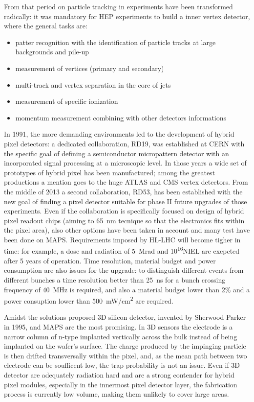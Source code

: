     From that period on particle tracking in experiments have been transformed radically: it was mandatory for HEP experiments to build a inner vertex detector, where the general tasks are:
    \begin{itemize}
        \item patter recognition with the identification of particle tracks at large backgrounds and pile-up
        \item measurement of vertices (primary and secondary)
        \item multi-track and vertex separation in the core of jets
        \item measurement of specific ionization
        \item momentum measurement combining with other detectors informations
    \end{itemize}

    In 1991, the more demanding environments led to the development of hybrid pixel detectors: a dedicated collaboration, RD19, was established at CERN with the specific goal of defining a semiconductor micropattern detector with an incorporated signal processing at a microscopic level. 
    In those years a wide set of prototypes of hybrid pixel has been manufactured; among the greatest productions a mention goes to the huge ATLAS and CMS vertex detectors. 
    From the middle of 2013 a second collaboration, RD53, has been established with the new goal of finding a pixel detector suitable for phase II future upgrades of those experiments. Even if the collaboration is specifically focused on design of hybrid pixel readout chips (aiming to \SI{65}{nm} tecnique so that the electronics fits within the pixel area), also other options have been taken in account and many test have been done on MAPS. Requirements imposed by HL-LHC will become tigher in time: for example, a dose and radiation of \SI{5}{Mrad} and \si{10^{16}}{NIEL} are exepcted after 5 years of operation. Time resolution, material budget and power consumption are also issues for the upgrade: to distinguish different events from different bunches a time resolution better than \SI{25}{ns} for a bunch crossing frequency of \SI{40}{MHz} is required, and also a material budget lower than 2\% and a power consuption lower than \SI{500}{mW/cm\squared} are required. 

    Amidst the solutions proposed 3D silicon detector, invented by Sherwood Parker in 1995, and MAPS are the most promising.
    In 3D sensors the electrode is a narrow column of n-type implanted vertically across the bulk instead of being implanted on the wafer's surface. 
    The charge produced by the impinging particle is then drifted transversally within the pixel, and, as the mean path between two electrode can be soufficent low, the trap probability is not an issue. 
    Even if 3D detector are adequately radiation hard and are a strong contender for hybrid pixel modules, especially in the innermost pixel detector layer, the fabrication process is currently low volume, making them unlikely to cover large areas.


